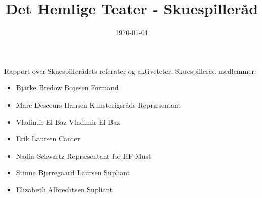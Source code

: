 \documentclass[12pt, a4paper]{article}
\title{Det Hemlige Teater - Skuespilleråd}
\date{\today}
\begin{document}
\maketitle
Rapport over Skuespillerådets referater og aktiveteter.
\vfill
Skuespilleråd medlemmer:
\begin{itemize}
  \item Bjarke Bredow Bojesen \hfill Formand
  \item Marc Descours Hansen \hfill Kunsterigsråds Repræsentant
  \item Vladimir El Baz \hfill Vladimir El Baz
  \item Erik Laursen Canter
  \item Nadia Schwartz \hfill Repræsentant for HF-Must
  \item Stinne Bjerregaard Laursen \hfill Supliant
  \item Elizabeth Albrechtsen \hfill Supliant
\end{itemize}
\end{document}
